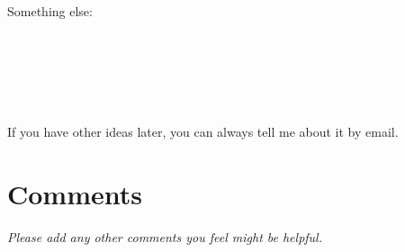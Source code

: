 \documentclass[article,twoside]{memoir}
\newcommand*{\fillunderscore}{~\hrulefill}
\newcommand{\header}[1]{\textsl{#1}}
\begin{document}
Something else: \fillunderscore\par
\fillunderscore\par
\fillunderscore\par
\fillunderscore

If you have other ideas later, you can always tell me about it by email.

\chapter{Comments}

\header{Please add any other comments you feel might be helpful.}

\fillunderscore\par
\fillunderscore\par
\fillunderscore\par
\fillunderscore\par
\fillunderscore\par
\fillunderscore\par
\fillunderscore\par
\fillunderscore\par
\fillunderscore
\end{document}
